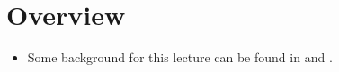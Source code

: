 \documentclass[11pt,twoside]{report}
\begin{document}



\section*{Overview} 

\begin{itemize}


\item Some background for this lecture can be found in  \cite[Chapter~4]{durrett:2012} and \cite[Chapter~5]{durrett:2019}.


\end{itemize}

%
%
%  
%  
\end{document}
